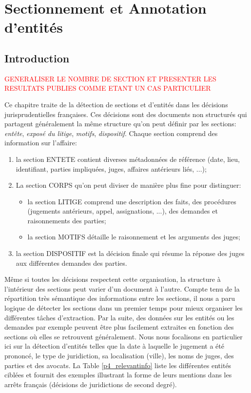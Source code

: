 \chapter{Sectionnement et Annotation d'entités}
\label{chap:structuration}

\section{Introduction}
\label{sec:structuration:motivation}

\textcolor{red}{GENERALISER LE NOMBRE DE SECTION ET PRESENTER LES RESULTATS PUBLIES COMME ETANT UN CAS PARTICULIER}

Ce chapitre traite de la détection de sections et d'entités dans les décisions jurisprudentielles françaises. Ces décisions sont des documents non structurés qui partagent généralement la même structure qu'on peut définir par les sections: \textit{entête}, \textit{exposé du litige}, \textit{motifs}, \textit{dispositif}. Chaque section comprend des information sur l'affaire: 
\begin{enumerate}
\item la section ENTETE contient diverses métadonnées de référence (date, lieu, identifiant, parties impliquées, juges, affaires antérieurs liés, ...); 
\item La section CORPS qu'on peut diviser de manière plus fine pour distinguer:
\begin{itemize}
\item la section LITIGE comprend une description des faits, des procédures (jugements antérieurs, appel, assignations, ...), des demandes et raisonnements des parties; 
\item la section MOTIFS détaille le raisonnement et les arguments des juges;
\end{itemize}
\item la section DISPOSITIF est la décision finale qui résume la réponse des juges aux différentes demandes des parties.
\end{enumerate}

 Même si toutes les décisions respectent cette organisation, la structure à l'intérieur des sections peut varier d'un document à l'autre. Compte tenu de la répartition très sémantique des informations entre les sections, il nous a paru logique de détecter les sections dans un premier temps pour mieux organiser les différentes tâches d'extraction. Par la suite, des données sur les entités ou les demandes par exemple peuvent être plus facilement extraites en fonction des sections où elles se retrouvent généralement. Nous nous focalisons en particulier ici sur la détection d'entités telles que la date à laquelle le jugement a été prononcé, le type de juridiction, sa localisation (ville), les noms de juges, des parties et des avocats. La Table \ref{p4_relevantinfo} liste les différentes entités ciblées et fournit des exemples illustrant la forme de leurs mentions dans les arrêts français (décisions de juridictions de second degré).

